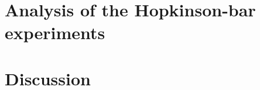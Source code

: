 \documentclass[12pt]{article}
\begin{document}
\section{Analysis of the Hopkinson-bar experiments}

\section{Discussion}

% 
% 




\end{document}
